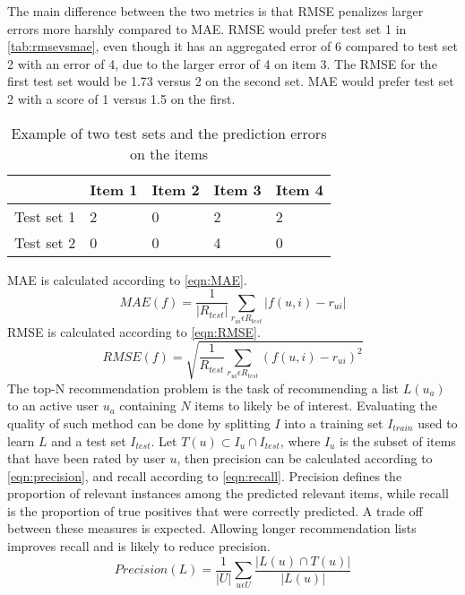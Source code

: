 The main difference between the two metrics is that RMSE penalizes larger errors more harshly compared to MAE.
RMSE would prefer test set 1 in \autoref{tab:rmsevsmae}, even though it has an aggregated error of 6 compared to test set 2 with an error of 4, due to the larger error of 4 on item 3.
The RMSE for the first test set would be 1.73 versus 2 on the second set.
MAE would prefer test set 2 with a score of 1 versus 1.5 on the first.
\begin{table}[]
    \begin{tabular}{|l|l|l|l|l|}
    \hline
               & Item 1 & Item 2 & Item 3 & Item 4 \\ \hline
    Test set 1 & 2      & 0      & 2      & 2      \\ \hline
    Test set 2 & 0      & 0      & 4      & 0      \\ \hline
    \end{tabular}
    \caption{Example of two test sets and the prediction errors on the items}
    \label{tab:rmsevsmae}
\end{table}
MAE is calculated according to \autoref{eqn:MAE}.
\begin{equation}
    \label{eqn:MAE}
    MAE(f) = \frac{1}{|R_{test}|} \sum\limits_{r_{ui} \epsilon R_{test}} |f(u,i)-r_{ui}|
\end{equation}
RMSE is calculated according to \autoref{eqn:RMSE}.
\begin{equation}
    \label{eqn:RMSE}
    RMSE(f) = \sqrt{\frac{1}{R_{test}} \sum\limits_{r_{ui} \epsilon R_{test}} (f(u, i) - r_{ui})^2}
\end{equation}
The top-N recommendation problem is the task of recommending a list $L(u_a)$ to an active user $u_a$ containing $N$ items to likely be of interest.
Evaluating the quality of such method can be done by splitting $I$ into a training set $I_{train}$ used to learn $L$ and a test set $I_{test}$.
Let $T(u) \subset I_u \cap I_{test}$, where $I_u$ is the subset of items that have been rated by user $u$, then precision can be calculated according to \autoref{eqn:precision}, and recall according to \autoref{eqn:recall}.
Precision defines the proportion of relevant instances among the predicted relevant items, while recall is the proportion of true positives that were correctly predicted.
A trade off between these measures is expected.
Allowing longer recommendation lists improves recall and is likely to reduce precision\cite{RecommenderHandbook2015}.
\begin{equation}
    \label{eqn:precision}
    Precision(L) = \frac{1}{|U|} \sum\limits_{u \epsilon U}\frac{|L(u) \cap T(u)|}{|L(u)|}
\end{equation}
